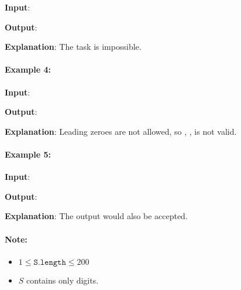 \begin{flushleft}
\textbf{Input}: 

\textbf{Output}: \fcj{[]}

\textbf{Explanation}: The task is impossible.
\end{flushleft}

\paragraph{Example 4:}

\begin{flushleft}
\textbf{Input}: 

\textbf{Output}: \fcj{[]}

\textbf{Explanation}: Leading zeroes are not allowed, so , ,  is not valid.
\end{flushleft}

\paragraph{Example 5:}

\begin{flushleft}
\textbf{Input}: 

\textbf{Output}: \fcj{[110, 1, 111]}

\textbf{Explanation}: The output \fcj{[11, 0, 11, 11]} would also be accepted.
\end{flushleft}

\paragraph{Note:}

\begin{itemize}
\item $1 \leq \texttt{S.length} \leq 200$

\item $S$ contains only digits.
\end{itemize}
